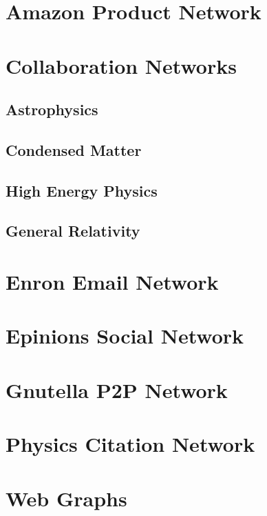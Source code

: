 \documentclass[phd,tocprelim]{cornell}
\begin{document}
\section{Amazon Product Network}



\section{Collaboration Networks}

\subsection{Astrophysics}

\subsection{Condensed Matter}

\subsection{High Energy Physics}

\subsection{General Relativity}



\section{Enron Email Network}

\section{Epinions Social Network}

\section{Gnutella P2P Network}

\section{Physics Citation Network}

\section{Web Graphs}
\end{document}
